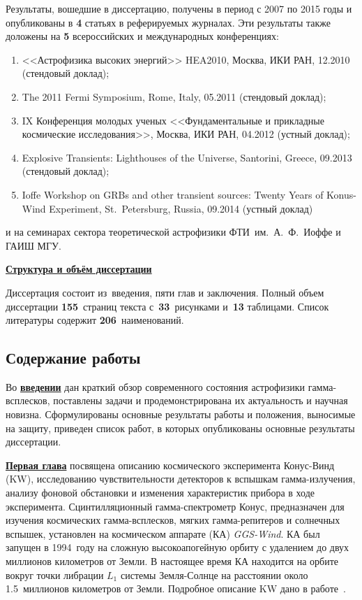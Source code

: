Результаты, вошедшие в диссертацию, получены в период с 2007 по 2015
годы и опубликованы в \textbf{4} статьях в реферируемых журналах.
Эти результаты также доложены на \textbf{5} всероссийских и международных конференциях: 
\begin{enumerate}
\item <<Астрофизика высоких энергий>> HEA2010, Москва, ИКИ РАН, 12.2010 (стендовый доклад);
\item The 2011 Fermi Symposium, Rome, Italy, 05.2011 (стендовый доклад);
\item IX Конференция молодых ученых <<Фундаментальные и прикладные космические исследования>>, 
    Москва, ИКИ РАН, 04.2012 (устный доклад);
\item Explosive Transients: Lighthouses of the Universe, Santorini, Greece, 09.2013 (стендовый доклад);
\item Ioffe Workshop on GRBs and other transient sources: Twenty Years of Konus-Wind Experiment, 
    St.~Petersburg, Russia, 09.2014 (устный доклад)
\end{enumerate}
и на семинарах сектора теоретической астрофизики ФТИ~им.~А.~Ф.~Иоффе и ГАИШ МГУ.




\underline{\textbf{Структура и объём диссертации}} 

Диссертация состоит из~введения, 
пяти глав и заключения. Полный объем диссертации \textbf{155}~страниц текста 
с~\textbf{33}~рисунками и~\textbf{13} таблицами. Список литературы содержит \textbf{206}~наименований.

\subsection*{\Large Содержание работы}
Во \underline{\textbf{введении}} дан краткий обзор современного состояния астрофизики гамма-всплесков,
поставлены задачи и продемонстрирована их актуальность и научная новизна.
Сформулированы основные результаты работы и положения, выносимые на защиту, приведен
список работ, в которых опубликованы основные результаты диссертации.

\underline{\textbf{Первая глава}} посвящена описанию космического эксперимента
Конус-Винд (KW), исследованию чувствительности детекторов к вспышкам гамма-излучения, 
анализу фоновой обстановки и изменения характеристик прибора в ходе эксперимента.
Сцинтилляционный гамма-спектрометр Конус, предназначен для изучения космических 
гамма-всплесков, мягких гамма-репитеров и солнечных вспышек, 
установлен на космическом аппарате (КА) \textit{GGS-Wind}. 
КА был запущен в 1994~году на сложную высокоапогейную орбиту 
с удалением до двух миллионов километров от Земли. В настоящее время КА находится 
на орбите вокруг точки либрации $L_1$ системы Земля-Солнце на расстоянии около 
1.5~миллионов километров от Земли.
Подробное описание KW дано в работе~\citep{Aptekar_1995SSR}.

